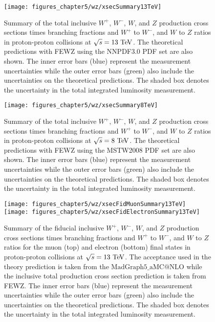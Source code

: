 \begin{figure}[h]
\centering
\texttt{[image: figures\_chapter5/wz/xsecSummary13TeV]}
\caption{Summary of the total inclusive $W^+$, $W^-$, $W$, and $Z$ production cross sections times branching fractions and $W^+$ to $W^-$, and $W$ to $Z$ ratios in proton-proton collisions at $\sqrt{s}=13~\mathrm{Te\kern -0.1em V}$. The theoretical predictions with FEWZ using the NNPDF3.0 PDF set are also shown. The inner error bars (blue) represent the measurement uncertainties while the outer error bars (green) also include the uncertainties on the theoretical predictions. The shaded box denotes the uncertainty in the total integrated luminosity measurement.}
\label{fig:13tev}
\end{figure}

\begin{figure}[h]
\centering
\texttt{[image: figures\_chapter5/wz/xsecSummary8TeV]}
\caption{Summary of the total inclusive $W^+$, $W^-$, $W$, and $Z$ production cross sections times branching fractions and $W^+$ to $W^-$, and $W$ to $Z$ ratios in proton-proton collisions at $\sqrt{s}=8~\mathrm{Te\kern -0.1em V}$. The theoretical predictions with FEWZ using the MSTW2008 PDF set are also shown. The inner error bars (blue) represent the measurement uncertainties while the outer error bars (green) also include the uncertainties on the theoretical predictions. The shaded box denotes the uncertainty in the total integrated luminosity measurement.}
\label{fig:8tev}
\end{figure}

\begin{figure}[h]
\centering
\texttt{[image: figures\_chapter5/wz/xsecFidMuonSummary13TeV]}
\texttt{[image: figures\_chapter5/wz/xsecFidElectronSummary13TeV]}
\caption{Summary of the fiducial inclusive $W^+$, $W^-$, $W$, and $Z$ production cross sections times branching fractions and $W^+$ to $W^-$, and $W$ to $Z$ ratios for the muon (top) and electron (bottom) final states in proton-proton collisions at $\sqrt{s}=13~\mathrm{Te\kern -0.1em V}$. The acceptance used in the theory prediction is taken from the $\mathrm{MadGraph5}\_\mathrm{aMC@NLO}$ while the inclusive total production cross section prediction is taken from FEWZ. The inner error bars (blue) represent the measurement uncertainties while the outer error bars (green) also include the uncertainties on the theoretical predictions. The shaded box denotes the uncertainty in the total integrated luminosity measurement.}
\label{fig:fid}
\end{figure}


